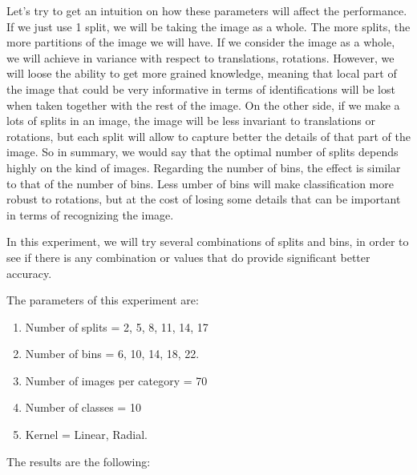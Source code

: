 Let's try to get an intuition on how these parameters will affect the performance. If we just use 1 split, we will be taking the image as a whole. The more splits, the more partitions of the image we will have. If we consider the image as a whole, we will achieve in variance with respect to translations, rotations. However, we will loose the ability to get more grained knowledge, meaning that local part of the image that could be very informative in terms of identifications will be lost when taken together with the rest of the image.
On the other side, if we make a lots of splits in an image, the image will be less invariant to translations or rotations, but each split will allow to capture better the details of that part of the image. So in summary, we would say that the optimal number of splits depends highly on the kind of images. 
Regarding the number of bins, the effect is similar to that of the number of bins. Less umber of bins will make classification more robust to rotations, but at the cost of losing some details that can be important in terms of recognizing the image. 

In this experiment, we will try several combinations of splits and bins, in order to see if there is any combination or values that do provide significant better accuracy. 

The parameters of this experiment are:
\begin{enumerate}
    \item Number of splits = 2, 5, 8, 11, 14, 17
    \item Number of bins = 6, 10, 14, 18, 22.
    \item Number of images per category = 70
    \item Number of classes = 10
    \item Kernel = Linear, Radial. 
\end{enumerate}

The results are the following:

